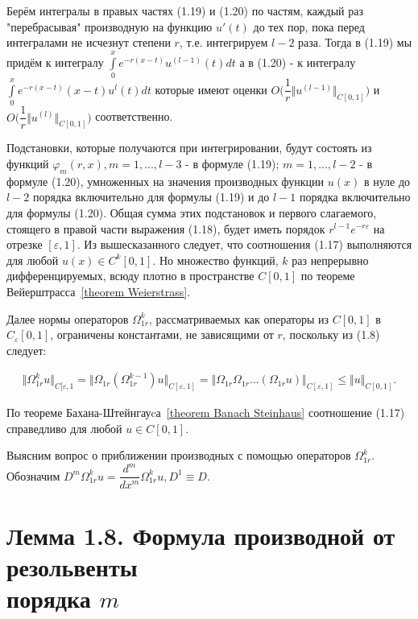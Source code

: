 Берём интегралы в правых частях (1.19) и (1.20) по частям, каждый раз "перебрасывая" производную на функцию $ u'(t) $ до тех пор, пока перед интегралами не исчезнут степени $ r $, т.е. интегрируем $ l-2 $ раза. Тогда в (1.19) мы придём к интегралу $ \int\limits_0^x e^{-r(x-t)}u^{(l-1)}(t)dt $  а в (1.20) - к интегралу $ \int\limits_0^x e^{-r(x-t)}(x - t)u^l(t)dt $ которые имеют оценки $ O\biggl( \dfrac{1}{r}\Vert u^{(l - 1)} \Vert_{C[0,1]} \biggr) $ и $ O\biggl( \dfrac{1}{r}\Vert u^{(l)} \Vert_{C[0,1]} \biggr) $ соответственно.

Подстановки, которые получаются при интегрировании, будут состоять из функций $ \varphi_m(r,x), m = 1,...,l-3 $ - в формуле (1.19); $ m = 1,...,l-2 $ - в формуле (1.20), умноженных на значения производных функции $ u(x) $ в нуле до $ l-2 $ порядка включительно для формулы (1.19) и до $ l-1 $ порядка включительно для формулы (1.20). Общая сумма этих подстановок и первого слагаемого, стоящего в правой части выражения (1.18), будет иметь порядок $ r^{l-1}e^{-r\varepsilon} $ на отрезке $ [\varepsilon ,1] $.
Из вышесказанного следует, что соотношения (1.17) выполняются для любой $ u(x) \in C^k[0,1] $. Но множество функций, $ k $ раз непрерывно дифференцируемых, всюду плотно в пространстве $ C[0,1] $ по теореме Вейерштрасса~\eqref{theorem Weierstrass}.

Далее нормы операторов $ \Omega_{1r}^k $, рассматриваемых как операторы из $ C[0,1] $ в $ C_\varepsilon [0,1] $, ограничены константами, не зависящими от $ r $, поскольку из (1.8) следует:

\begin{equation}
\begin{array}{c}
\nonumber

\Vert \Omega_{1r}^ku \Vert_{C[\varepsilon ,1} = \Vert \Omega_{1r}(\Omega_{1r}^{k-1})u \Vert_{C[\varepsilon ,1]} = \Vert \Omega_{1r}\Omega_{1r}...(\Omega_{1r}u) \Vert_{C[\varepsilon ,1]} \leq \Vert u \Vert_{C[0,1]}.

\end{array}
\end{equation}


По теореме Бахана-Штейнгауcа~\eqref{theorem Banach Steinhaus} соотношение (1.17) справедливо для любой $ u \in C[0,1] $.

Выясним вопрос о приближении производных с помощью операторов $ \Omega_{1r}^k $. Обозначим $ D^m\Omega_{1r}^ku = \dfrac{d^m}{dx^m}\Omega_{1r}^ku, D^1 \equiv D $.

\section{Лемма 1.8. Формула производной от резольвенты \\ порядка $ m $}
\label{lemma1.8}


